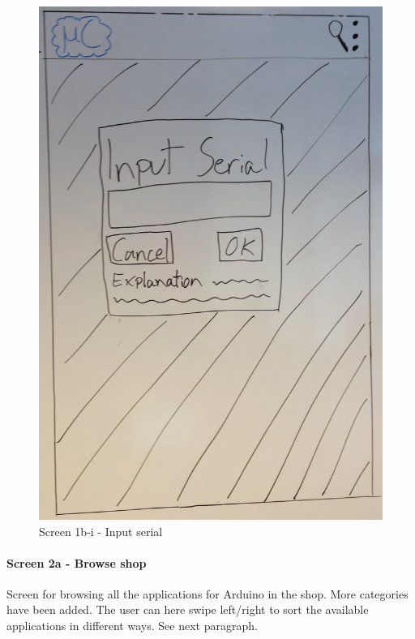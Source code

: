 \begin{figure}[H]
\centering
\includegraphics[scale=0.2]{images/Design_guide/Screen1b-i.png}
\caption{Screen 1b-i - Input serial}
\label{fig:screen1bi}
\end{figure}


\paragraph{Screen 2a - Browse shop}
Screen for browsing all the applications for Arduino in the shop. More categories have been added. The user can here swipe left/right to sort the available applications in different ways. See next paragraph.

